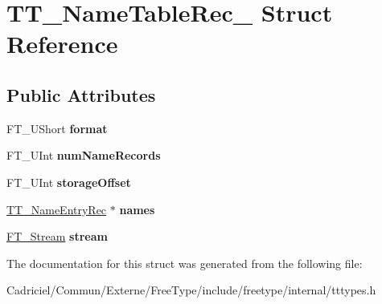 \hypertarget{struct_t_t___name_table_rec__}{\section{T\-T\-\_\-\-Name\-Table\-Rec\-\_\- Struct Reference}
\label{struct_t_t___name_table_rec__}
}
\subsection*{Public Attributes}
\begin{DoxyCompactItemize}
\item 
\hypertarget{struct_t_t___name_table_rec___a762c5431cbe285cb7153bb5650710fb0}{F\-T\-\_\-\-U\-Short {\bfseries format}}\label{struct_t_t___name_table_rec___a762c5431cbe285cb7153bb5650710fb0}

\item 
\hypertarget{struct_t_t___name_table_rec___a5b565d940b9d02bb69cd19da5cda61b8}{F\-T\-\_\-\-U\-Int {\bfseries num\-Name\-Records}}\label{struct_t_t___name_table_rec___a5b565d940b9d02bb69cd19da5cda61b8}

\item 
\hypertarget{struct_t_t___name_table_rec___a4ed1f4e78e39b2e206411e9ea4d23801}{F\-T\-\_\-\-U\-Int {\bfseries storage\-Offset}}\label{struct_t_t___name_table_rec___a4ed1f4e78e39b2e206411e9ea4d23801}

\item 
\hypertarget{struct_t_t___name_table_rec___a693aed17954386eb8fb5fd7f69d5b551}{\hyperlink{struct_t_t___name_entry_rec__}{T\-T\-\_\-\-Name\-Entry\-Rec} $\ast$ {\bfseries names}}\label{struct_t_t___name_table_rec___a693aed17954386eb8fb5fd7f69d5b551}

\item 
\hypertarget{struct_t_t___name_table_rec___a97109aec8cd7ca13f6627f3fee15d48d}{\hyperlink{struct_f_t___stream_rec__}{F\-T\-\_\-\-Stream} {\bfseries stream}}\label{struct_t_t___name_table_rec___a97109aec8cd7ca13f6627f3fee15d48d}

\end{DoxyCompactItemize}


The documentation for this struct was generated from the following file\-:\begin{DoxyCompactItemize}
\item 
Cadriciel/\-Commun/\-Externe/\-Free\-Type/include/freetype/internal/tttypes.\-h\end{DoxyCompactItemize}

